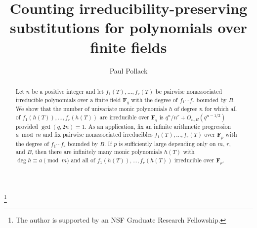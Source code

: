 \documentclass[a4paper]{compositio}
\begin{document}
\renewcommand{\theenumi}{\roman{enumi}}
\newtheorem*{abh}{Abhyankar's Lemma}
\newtheorem*{hl}{A Hardy-Littlewood Conjecture for Polynomials over $\F_q$}
\newtheorem*{bang}{Bang's Theorem on Primitive Prime Divisors}
\newtheorem*{bsd}{A Criterion of Birch \& Swinnerton-Dyer}
\newtheorem*{cast}{Castelnuovo's Inequality}
\newtheorem*{cheb}{Explicit Chebotarev Density Theorem for First Degree Primes}
\newtheorem*{hyph}{Hypothesis H}
\newtheorem*{thma}{Theorem A}
\newtheorem*{guess}{Conjecture}
\newtheorem{thm}{Theorem}
\newtheorem*{theorem}{Theorem}
\newtheorem*{corollary}{Corollary}
\newtheorem{conj}[thm]{Conjecture}
\newtheorem{lem}[thm]{Lemma}
\newtheorem{cor}[thm]{Corollary}
\newtheorem{prop}[thm]{Proposition}
\theoremstyle{remark}
\newtheorem*{example}{Example}
\theoremstyle{definition}
\newtheorem*{rmk}{Remark}
\newtheorem*{rmks}{Remarks}
\def\sing{\mathfrak{S}}
\def\disc{\mathrm{disc}}
\def\res{\mathrm{res}}
\def\Frob{\mathrm{Frob}}
\def\Gal{\mathrm{Gal}}
\def\Sym{\mathrm{Sym}}
\def\I{\mathcal{I}}
\def\P{\mathcal{P}}
\def\Z{\mathbf{Z}}
\def\R{\mathbf{R}}
\def\Q{\mathbf{Q}}
\def\F{\mathbf{F}}
\def\C{\mathcal{C}}
\def\Nm{\mathrm{Nm}}
\def\Tr{\mathrm{Tr}}
\def\lcm{\mathrm{lcm}}
\newcommand{\leg}[2]{\genfrac{(}{)}{}{}{#1}{#2}}
\title[Counting Irreducibility-preserving substitutions]{Counting irreducibility-preserving substitutions for polynomials over
finite fields}
\author{Paul Pollack}
 \thanks{The author is supported
by an NSF Graduate Research Fellowship.}
\begin{abstract} Let $n$ be a positive integer and let $f_1(T), \dots, f_r(T)$ be
pairwise nonassociated irreducible polynomials over a finite field
$\F_q$ with the degree of $f_1 \cdots f_r$ bounded by $B$.  We show
that the number of univariate monic polynomials $h$ of degree $n$
for which all of $f_1(h(T)), \dots, f_r(h(T))$ are irreducible over
$\F_q$ is $q^n/n^r + O_{n,B}(q^{n-1/2})$ provided $\gcd(q,2n)=1$. As
an application, fix an infinite arithmetic progression $a \bmod{m}$
and fix pairwise nonassociated irreducibles $f_1(T), \dots, f_r(T)$
over $\F_p$ with the degree of $f_1\cdots f_r$ bounded by $B$. If
$p$ is sufficiently large depending only on $m$, $r$, and $B$, then
there are infinitely many monic polynomials $h(T)$ with
$\deg{h}\equiv a \pmod{m}$ and all of $f_1(h(T)), \dots, f_r(h(T))$
irreducible over $\F_p$.
\end{abstract}
\address{Department of Mathematics\\Dartmouth College\\Hanover, NH 03755}
\maketitle
\end{document}
